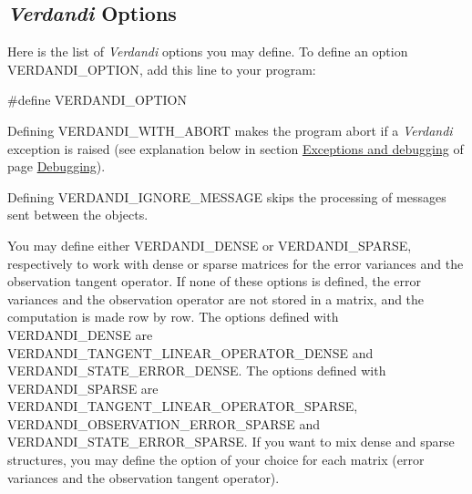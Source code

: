 \documentclass{tufte-book}
\begin{document}
\hypertarget{tips_options}{}\subsection{\emph{Verdandi} \-Options}\label{tips_options}
\-Here is the list of \-\emph{Verdandi} options you may define. \-To define an option {\ttfamily \-V\-E\-R\-D\-A\-N\-D\-I\-\_\-\-O\-P\-T\-I\-O\-N}, add this line to your program\-:

 \begin{frame_cpp}
#define VERDANDI_OPTION
\end{frame_cpp}


\-Defining {\ttfamily \-V\-E\-R\-D\-A\-N\-D\-I\-\_\-\-W\-I\-T\-H\-\_\-\-A\-B\-O\-R\-T} makes the program abort if a \-\emph{Verdandi} exception is raised (see explanation below in section \hyperlink{debugging_exceptions_and_debugging}{\-Exceptions and debugging} of page \hyperlink{debugging}{\-Debugging}).

\-Defining {\ttfamily \-V\-E\-R\-D\-A\-N\-D\-I\-\_\-\-I\-G\-N\-O\-R\-E\-\_\-\-M\-E\-S\-S\-A\-G\-E} skips the processing of messages sent between the objects.

\-You may define either {\ttfamily \-V\-E\-R\-D\-A\-N\-D\-I\-\_\-\-D\-E\-N\-S\-E} or {\ttfamily \-V\-E\-R\-D\-A\-N\-D\-I\-\_\-\-S\-P\-A\-R\-S\-E}, respectively to work with dense or sparse matrices for the error variances and the observation tangent operator. \-If none of these options is defined, the error variances and the observation operator are not stored in a matrix, and the computation is made row by row. \-The options defined with {\ttfamily \-V\-E\-R\-D\-A\-N\-D\-I\-\_\-\-D\-E\-N\-S\-E} are {\ttfamily \-V\-E\-R\-D\-A\-N\-D\-I\-\_\-\-T\-A\-N\-G\-E\-N\-T\-\_\-\-L\-I\-N\-E\-A\-R\-\_\-\-O\-P\-E\-R\-A\-T\-O\-R\-\_\-\-D\-E\-N\-S\-E} and {\ttfamily \-V\-E\-R\-D\-A\-N\-D\-I\-\_\-\-S\-T\-A\-T\-E\-\_\-\-E\-R\-R\-O\-R\-\_\-\-D\-E\-N\-S\-E}. \-The options defined with {\ttfamily \-V\-E\-R\-D\-A\-N\-D\-I\-\_\-\-S\-P\-A\-R\-S\-E} are {\ttfamily \-V\-E\-R\-D\-A\-N\-D\-I\-\_\-\-T\-A\-N\-G\-E\-N\-T\-\_\-\-L\-I\-N\-E\-A\-R\-\_\-\-O\-P\-E\-R\-A\-T\-O\-R\-\_\-\-S\-P\-A\-R\-S\-E}, {\ttfamily \-V\-E\-R\-D\-A\-N\-D\-I\-\_\-\-O\-B\-S\-E\-R\-V\-A\-T\-I\-O\-N\-\_\-\-E\-R\-R\-O\-R\-\_\-\-S\-P\-A\-R\-S\-E} and {\ttfamily \-V\-E\-R\-D\-A\-N\-D\-I\-\_\-\-S\-T\-A\-T\-E\-\_\-\-E\-R\-R\-O\-R\-\_\-\-S\-P\-A\-R\-S\-E}. \-If you want to mix dense and sparse structures, you may define the option of your choice for each matrix (error variances and the observation tangent operator).
\end{document}
